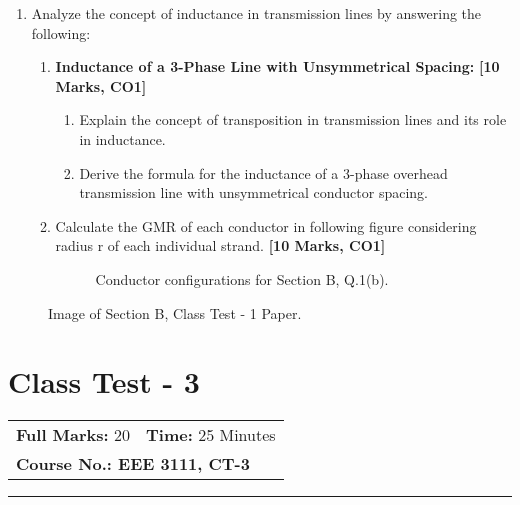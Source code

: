 \documentclass[12pt, a4paper]{article}
\begin{document}
	\begin{enumerate}[label=\textbf{Q.\arabic*}]
		\item Analyze the concept of inductance in transmission lines by answering the following:
		\begin{enumerate}[label=\textbf{(\alph*)}]
			\item \textbf{Inductance of a 3-Phase Line with Unsymmetrical Spacing:} \hfill \textbf{[10 Marks, CO1]}
			\begin{enumerate}[label=(\roman*)]
				\item Explain the concept of transposition in transmission lines and its role in inductance.
				\item Derive the formula for the inductance of a 3-phase overhead transmission line with unsymmetrical conductor spacing.
			\end{enumerate}
			\item Calculate the GMR of each conductor in following figure considering radius r of each individual strand. \hfill \textbf{[10 Marks, CO1]}
			\begin{figure}[h!]
				\centering
				\caption{Conductor configurations for Section B, Q.1(b).}
			\end{figure}
		\end{enumerate}
	\end{enumerate}
	
	\begin{figure}[h!]
		\centering
		\caption{Image of Section B, Class Test - 1 Paper.}
	\end{figure}
	
	\newpage
	
	\section{Class Test - 3}
	\begin{tabular}{ll}
		\textbf{Full Marks:} 20 & \textbf{Time:} 25 Minutes \\
		\multicolumn{2}{l}{\textbf{Course No.: EEE 3111, CT-3}} \\
	\end{tabular}
	\hrule
	\vspace{0.5cm}
	
\end{document}
